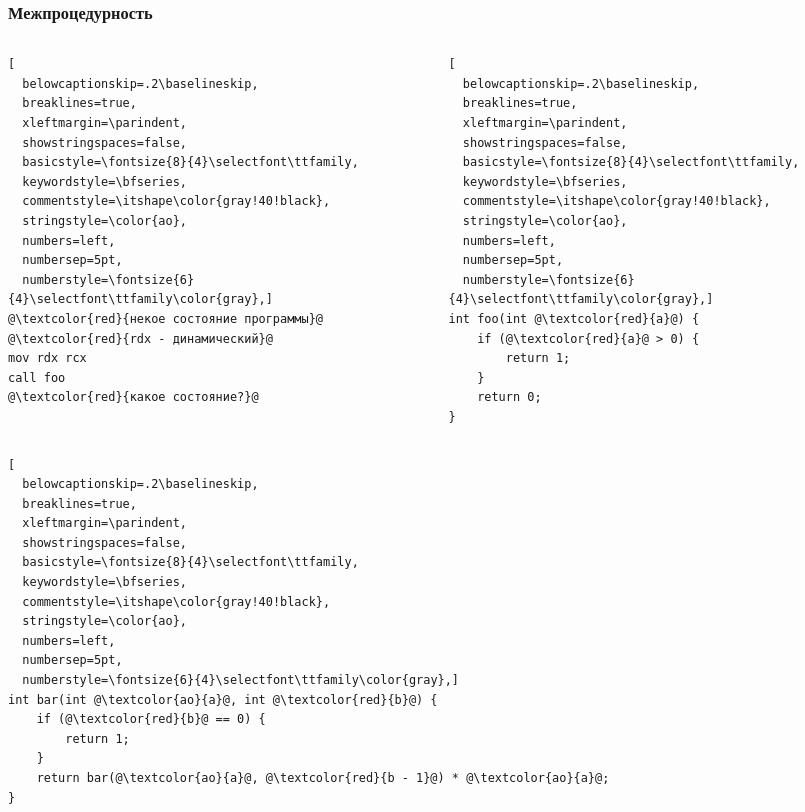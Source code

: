 \documentclass{beamer}
\begin{document}
\begin{frame}[fragile]\frametitle{Межпроцедурность}

\vfill
\begin{columns}
\begin{column}{0.5\textwidth}
\begin{lstlisting}[
  belowcaptionskip=.2\baselineskip,
  breaklines=true,
  xleftmargin=\parindent,
  showstringspaces=false,
  basicstyle=\fontsize{8}{4}\selectfont\ttfamily,
  keywordstyle=\bfseries,
  commentstyle=\itshape\color{gray!40!black},
  stringstyle=\color{ao},
  numbers=left,
  numbersep=5pt,
  numberstyle=\fontsize{6}{4}\selectfont\ttfamily\color{gray},]
@\textcolor{red}{некое состояние программы}@
@\textcolor{red}{rdx - динамический}@
mov rdx rcx 
call foo
@\textcolor{red}{какое состояние?}@
\end{lstlisting}
\end{column}
\begin{column}{0.5\textwidth}
\begin{lstlisting}[
  belowcaptionskip=.2\baselineskip,
  breaklines=true,
  xleftmargin=\parindent,
  showstringspaces=false,
  basicstyle=\fontsize{8}{4}\selectfont\ttfamily,
  keywordstyle=\bfseries,
  commentstyle=\itshape\color{gray!40!black},
  stringstyle=\color{ao},
  numbers=left,
  numbersep=5pt,
  numberstyle=\fontsize{6}{4}\selectfont\ttfamily\color{gray},]
int foo(int @\textcolor{red}{a}@) {
    if (@\textcolor{red}{a}@ > 0) {
        return 1;
    }
    return 0;
}
\end{lstlisting}
\end{column}
\end{columns}
\vfill
\begin{columns}
\begin{column}{\textwidth}
\begin{lstlisting}[
  belowcaptionskip=.2\baselineskip,
  breaklines=true,
  xleftmargin=\parindent,
  showstringspaces=false,
  basicstyle=\fontsize{8}{4}\selectfont\ttfamily,
  keywordstyle=\bfseries,
  commentstyle=\itshape\color{gray!40!black},
  stringstyle=\color{ao},
  numbers=left,
  numbersep=5pt,
  numberstyle=\fontsize{6}{4}\selectfont\ttfamily\color{gray},]
int bar(int @\textcolor{ao}{a}@, int @\textcolor{red}{b}@) {
    if (@\textcolor{red}{b}@ == 0) {
        return 1;
    }
    return bar(@\textcolor{ao}{a}@, @\textcolor{red}{b - 1}@) * @\textcolor{ao}{a}@;
}
\end{lstlisting}
\end{column}
\end{columns}
\vfill
\end{frame}
\end{document}
